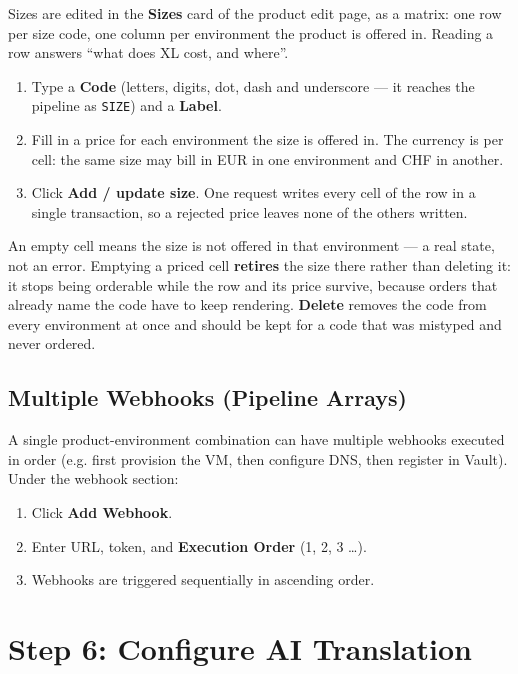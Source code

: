 \documentclass[12pt,a4paper,twoside]{report}
\newcommand{\notebox}[1]{\begin{tcolorbox}[noteboxstyle]#1\end{tcolorbox}}
\newcommand{\code}[1]{\texttt{#1}}
\begin{document}
Sizes are edited in the \textbf{Sizes} card of the product edit page, as a
matrix: one row per size code, one column per environment the product is offered
in. Reading a row answers ``what does XL cost, and where''.

\begin{enumerate}
  \item Type a \textbf{Code} (letters, digits, dot, dash and underscore --- it
        reaches the pipeline as \code{SIZE}) and a \textbf{Label}.
  \item Fill in a price for each environment the size is offered in. The
        currency is per cell: the same size may bill in EUR in one environment
        and CHF in another.
  \item Click \textbf{Add / update size}. One request writes every cell of the
        row in a single transaction, so a rejected price leaves none of the
        others written.
\end{enumerate}

\notebox{An empty cell means the size is not offered in that environment ---
a real state, not an error. Emptying a priced cell \textbf{retires} the size
there rather than deleting it: it stops being orderable while the row and its
price survive, because orders that already name the code have to keep
rendering. \textbf{Delete} removes the code from every environment at once and
should be kept for a code that was mistyped and never ordered.}

\subsection{Multiple Webhooks (Pipeline Arrays)}

A single product-environment combination can have multiple webhooks
executed in order (e.g. first provision the VM, then configure DNS,
then register in Vault). Under the webhook section:

\begin{enumerate}
  \item Click \textbf{Add Webhook}.
  \item Enter URL, token, and \textbf{Execution Order} (1, 2, 3 …).
  \item Webhooks are triggered sequentially in ascending order.
\end{enumerate}

\section{Step 6: Configure AI Translation}
\end{document}

